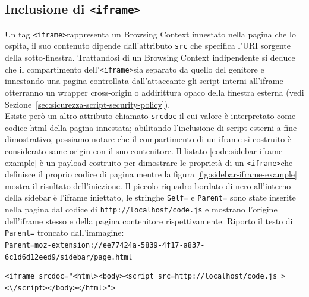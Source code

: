 \documentclass{sapthesis}
\newcommand{\code}[1]{\texttt{#1}}
\newcommand{\file}[1]{\code{#1}}
\newcommand{\refSection}[1]{Sezione~\ref{#1}}
\newcommand{\tagHTML}[1]{\code{<#1>}}
\newcommand{\iframe}{\tagHTML{iframe}}
\begin{document}
        
        \subsection{Inclusione di \iframe}
        \label{sec:attaccando-vuln-bypass-iframe}
            Un tag \iframe rappresenta un Browsing Context
            innestato nella pagina che lo ospita, il suo contenuto dipende dall'attributo \code{src} che specifica
            l'URI sorgente della sotto-finestra. Trattandosi di un Browsing Context indipendente si deduce che
            il compartimento dell'\iframe sia separato da quello del genitore e innestando una pagina controllata
            dall'attaccante gli script interni all'iframe otterranno un wrapper cross-origin o addirittura opaco
            della finestra esterna (vedi \refSection{sec:sicurezza-script-security-policy}).\\
            Esiste però un altro attributo chiamato \code{srcdoc} il cui valore è interpretato come codice html della
            pagina innestata; abilitando l'inclusione di script esterni a fine dimostrativo, possiamo notare che
            il compartimento di un iframe sì costruito è considerato same-origin con il suo contenitore.
            Il listato \ref{code:sidebar-iframe-example} è un payload costruito per dimostrare le proprietà di un
            \iframe che definisce il proprio codice di pagina mentre la figura \ref{fig:sidebar-iframe-example}
            mostra il risultato dell'iniezione. Il piccolo riquadro bordato di nero all'interno della sidebar è
            l'iframe iniettato, le stringhe \code{Self=} e \code{Parent=} sono state inserite nella pagina dal
            codice di \file{http://localhost/code.js} e mostrano l'origine dell'iframe stesso e della pagina
            contenitore rispettivamente. Riporto il testo di \code{Parent=} troncato dall'immagine:\\
            \code{Parent=moz-extension://ee77424a-5839-4f17-a837-6c1d6d12eed9/sidebar/page.html}\\

            \begin{lstlisting}[caption={iframe costruito con srcdoc},label={code:sidebar-iframe-example}]
<iframe srcdoc="<html><body><script src=http://localhost/code.js ><\/script></body></html>">
\end{lstlisting}
\end{document}
